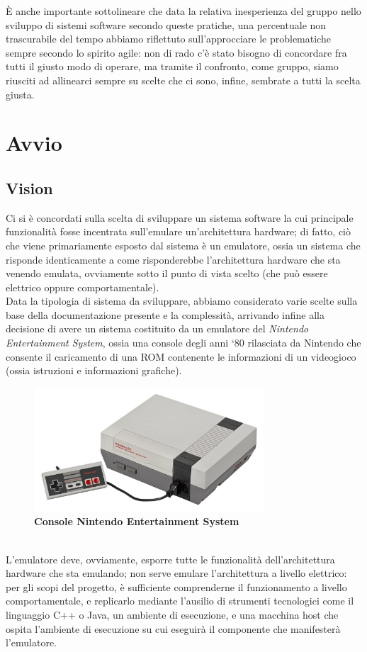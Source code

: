 \documentclass[11pt]{article}
\begin{document}
È anche importante sottolineare che data la relativa inesperienza del gruppo nello sviluppo di sistemi software secondo queste pratiche, una percentuale non trascurabile del tempo abbiamo riflettuto sull'approcciare le problematiche sempre secondo lo spirito agile: non di rado c'è stato bisogno di concordare fra tutti il giusto modo di operare, ma tramite il confronto, come gruppo, siamo riusciti ad allinearci sempre su scelte che ci sono, infine, sembrate a tutti la scelta giusta.

\section{Avvio}
\subsection{Vision}
Ci si è concordati sulla scelta di sviluppare un sistema software la cui principale funzionalità fosse incentrata sull'emulare un'architettura hardware; di fatto, ciò che viene primariamente esposto dal sistema è un emulatore, ossia un sistema che risponde identicamente a come risponderebbe l'architettura hardware che sta venendo emulata, ovviamente sotto il punto di vista scelto (che può essere elettrico oppure comportamentale).\\
Data la tipologia di sistema da sviluppare, abbiamo considerato varie scelte sulla base della documentazione presente e la complessità, arrivando infine alla decisione di avere un sistema costituito da un emulatore del \emph{Nintendo Entertainment System}, ossia una console degli anni `80 rilasciata da Nintendo che consente il caricamento di una ROM contenente le informazioni di un videogioco (ossia istruzioni e informazioni grafiche). 
\begin{figure}[h]
\centering
\includegraphics[width=325px, height=175px]{NES_CONSOLE.jpg}\\
\small\textbf{Console Nintendo Entertainment System}
\end{figure}\\
L'emulatore deve, ovviamente, esporre tutte le funzionalità dell'architettura hardware che sta emulando; non serve emulare l'architettura a livello elettrico: per gli scopi del progetto, è sufficiente comprenderne il funzionamento a livello comportamentale, e replicarlo mediante l'ausilio di strumenti tecnologici come il linguaggio C++ o Java, un ambiente di esecuzione, e una macchina host che ospita l'ambiente di esecuzione su cui eseguirà il componente che manifesterà l'emulatore.
\end{document}
